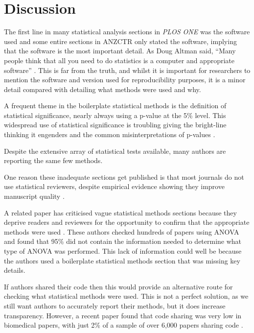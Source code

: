 \documentclass[12pt]{article}
\begin{document}
\hypertarget{discussion}{%
\section{Discussion}\label{discussion}}

The first line in many statistical analysis sections in \emph{PLOS ONE}
was the software used and some entire sections in ANZCTR only stated the
software, implying that the software is the most important detail. As
Doug Altman said, ``Many people think that all you need to do statistics
is a computer and appropriate software'' \citep{Altman1994}. This is far
from the truth, and whilst it is important for researchers to mention
the software and version used for reproducibility purposes, it is a
minor detail compared with detailing what methods were used and why.

A frequent theme in the boilerplate statistical methods is the
definition of statistical significance, nearly always using a p-value at
the 5\% level. This widespread use of statistical significance is
troubling giving the bright-line thinking it engenders
\citep{McShane2019} and the common misinterpretations of p-values
\citep{Goodman2008}.

Despite the extensive array of statistical tests available, many authors
are reporting the same few methods.

One reason these inadequate sections get published is that most journals
do not use statistical reviewers, despite empirical evidence showing
they improve manuscript quality \citep{Hardwicke2020}.

A related paper has criticised vague statistical methods sections
because they deprive readers and reviewers for the opportunity to
confirm that the appropriate methods were used \citep{Weissgerber2018}.
These authors checked hundreds of papers using ANOVA and found that 95\%
did not contain the information needed to determine what type of ANOVA
was performed. This lack of information could well be because the
authors used a boilerplate statistical methods section that was missing
key details.

If authors shared their code then this would provide an alternative
route for checking what statistical methods were used. This is not a
perfect solution, as we still want authors to accurately report their
methods, but it does increase transparency. However, a recent paper
found that code sharing was very low in biomedical papers, with just 2\%
of a sample of over 6,000 papers sharing code \citep{Serghiou2021}.
\end{document}
